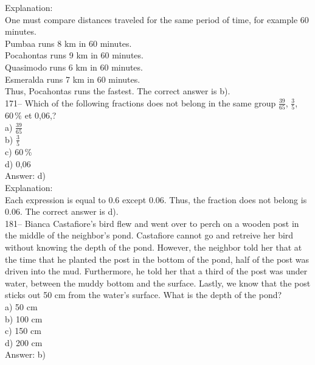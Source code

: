 \documentclass[letterpaper, 12pt]{article}
\begin{document}
Explanation:\\
One must compare distances traveled for the same period of time, for example 60 minutes. \\
Pumbaa runs 8 km in 60 minutes.\\
Pocahontas runs 9 km in 60 minutes.\\
Quasimodo runs 6 km in 60 minutes.\\
Esmeralda runs 7 km in 60 minutes.\\
Thus, Pocahontas runs the fastest. The correct answer is b).\\


171-- Which of the following fractions does not belong in the same group $\frac{39}{65}$, $\frac{3}{5}$, $60\,\%$ et 0,06,?\\

a) $\frac{39}{65}$\\[2mm]
b) $\frac{3}{5}$\\[2mm]
c) $60\,\%$\\[2mm]
d) 0,06\\

Answer: d)\\

Explanation:\\
Each expression is equal to 0.6 except 0.06. Thus, the fraction does not belong is 0.06. The correct answer is d).\\



181-- Bianca Castafiore's bird flew and went over to perch on a wooden post in the middle of the neighbor's pond. Castafiore cannot go and retreive her bird without knowing the depth of the pond. However, the neighbor told her that at the time that he planted the post in the bottom of the pond, half of the post was driven into the mud. Furthermore, he told her that a third of the post was under water, between the muddy bottom and the surface. Lastly, we know that the post sticks out 50 cm from the water's surface. What is the depth of the pond?\\

a) 50 cm\\
b) 100 cm\\
c) 150 cm\\
d) 200 cm\\

Answer: b)\\
\end{document}
